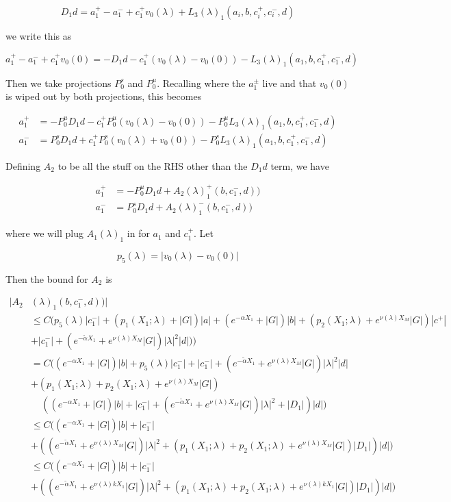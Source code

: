 \documentclass[12pt]{article}
\begin{document}
\begin{enumerate}
\[
D_1 d = a_1^+ - a_1^- + c_1^+ v_0(\lambda) + L_3(\lambda)_1(a_i, b, c_i^+, c_i^-, d)
\]

we write this as

\[
a_1^+ - a_1^- + c_1^+ v_0(0) = -D_1 d - c_1^+ (v_0(\lambda) - v_0(0)) - L_3(\lambda)_1(a_1, b, c_1^+, c_1^-, d)
\]

Then we take projections $P^s_0$ and $P^u_0$. Recalling where the $a_1^\pm$ live and that $v_0(0)$ is wiped out by both projections, this becomes 

\begin{align*}
a_1^+ &= -P^u_0 D_1 d - c_1^+ P^u_0 (v_0(\lambda) - v_0(0)) - P^u_0 L_3(\lambda)_1(a_1, b, c_1^+, c_1^-, d) \\
a_1^- &=  P^s_0 D_1 d + c_1^+ P^s_0 (v_0(\lambda) + v_0(0)) - P^s_0 L_3(\lambda)_1(a_1, b, c_1^+, c_1^-, d)
\end{align*}

Defining $A_2$ to be all the stuff on the RHS other than the $D_1 d$ term, we have

\begin{align*}
a_1^+ &= -P^u_0 D_1 d + A_2(\lambda)_1^+(b, c_1^-, d))\\
a_1^- &=  P^s_0 D_1 d + A_2(\lambda)_1^-(b, c_1^-, d))
\end{align*}

where we will plug $A_1(\lambda)_1$ in for $a_1$ and $c_1^+$. Let 

\[
p_5(\lambda) = |v_0(\lambda) - v_0(0)| 
\]

Then the bound for $A_2$ is

\begin{align*}
|A_2&(\lambda)_1(b, c_1^-, d))| \\
&\leq C( p_5(\lambda) |c_1^-| + (p_1(X_1; \lambda) + |G|)|a| + (e^{-\alpha X_1} + |G|) |b| + ( p_2(X_1; \lambda) + e^{\nu(\lambda)X_M} |G|) |c^+| \\
&+ |c_1^-| + (e^{-\tilde{\alpha} X_1} + e^{\nu(\lambda)X_M} |G|) |\lambda|^2 |d| ) ) \\
&= C( (e^{-\alpha X_1} + |G|) |b| + p_5(\lambda) |c_1^-| + |c_1^-| + (e^{-\tilde{\alpha} X_1} + e^{\nu(\lambda)X_M} |G|) |\lambda|^2 |d| \\
&+ (p_1(X_1; \lambda) + p_2(X_1; \lambda) + e^{\nu(\lambda)X_M} |G|) \\
&\:\:\:\:\:( ( e^{-\alpha X_1} + |G|) |b| + |c_1^-| + (e^{-\tilde{\alpha} X_1} + e^{\nu(\lambda)X_M} |G|) |\lambda|^2 + |D_1|) |d| )\\
&\leq C( (e^{-\alpha X_1} + |G|) |b| + |c_1^-| \\
&+ ((e^{-\tilde{\alpha} X_1} + e^{\nu(\lambda)X_M} |G|) |\lambda|^2 + (p_1(X_1; \lambda) + p_2(X_1; \lambda) + e^{\nu(\lambda)X_M} |G|)|D_1|)|d| )\\
&\leq C( (e^{-\alpha X_1} + |G|) |b| + |c_1^-| \\
&+ ((e^{-\tilde{\alpha} X_1} + e^{\nu(\lambda)k X_1} |G|) |\lambda|^2 + (p_1(X_1; \lambda) + p_2(X_1; \lambda) + e^{\nu(\lambda) k X_1} |G|)|D_1|)|d| )
\end{align*}


\end{enumerate}
\end{document}
